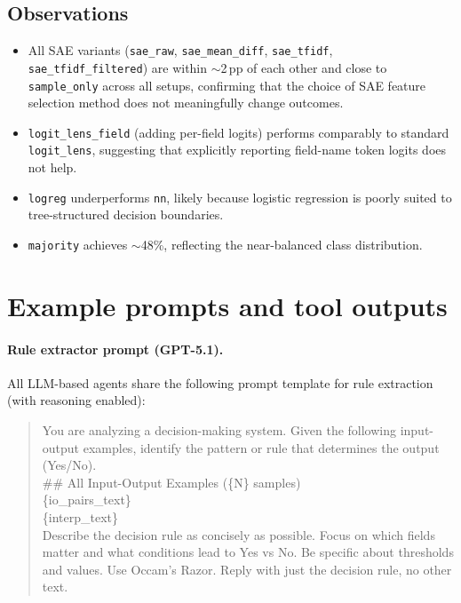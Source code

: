 \documentclass{article} %
\begin{document}
\subsection{Observations}
\begin{itemize}[nosep]
    \item All SAE variants (\texttt{sae\_raw}, \texttt{sae\_mean\_diff}, \texttt{sae\_tfidf}, \texttt{sae\_tfidf\_filtered}) are within ${\sim}$2\,pp of each other and close to \texttt{sample\_only} across all setups, confirming that the choice of SAE feature selection method does not meaningfully change outcomes.
    \item \texttt{logit\_lens\_field} (adding per-field logits) performs comparably to standard \texttt{logit\_lens}, suggesting that explicitly reporting field-name token logits does not help.
    \item \texttt{logreg} underperforms \texttt{nn}, likely because logistic regression is poorly suited to tree-structured decision boundaries.
    \item \texttt{majority} achieves ${\sim}$48\%, reflecting the near-balanced class distribution.
\end{itemize}

\section{Example prompts and tool outputs}
\label{app:prompts}

\paragraph{Rule extractor prompt (GPT-5.1).}
All LLM-based agents share the following prompt template for rule extraction (with reasoning enabled):

\begin{quote}
\small\ttfamily
You are analyzing a decision-making system. Given the following input-output examples, identify the pattern or rule that determines the output (Yes/No).\\[4pt]
\#\# All Input-Output Examples (\{N\} samples)\\[4pt]
\{io\_pairs\_text\}\\
\{interp\_text\}\\[4pt]
Describe the decision rule as concisely as possible. Focus on which fields matter and what conditions lead to Yes vs No. Be specific about thresholds and values. Use Occam's Razor. Reply with just the decision rule, no other text.
\end{quote}
\end{document}
